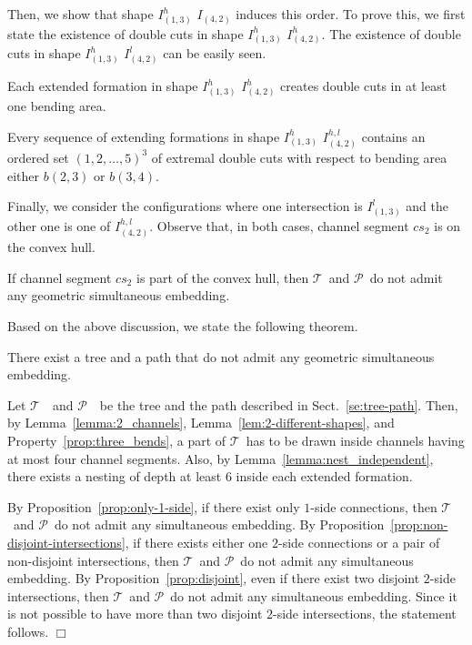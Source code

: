 \documentclass[a4paper,10pt]{llncs}
\newcounter{prop}
\renewenvironment{proof}
{{\bf Proof:}}{\hspace*{\fill}$\Box$\par\vspace{2mm}}
\newcommand{\T}{\mbox{$\mathcal T$ }}
\renewcommand{\P}{\mbox{$\mathcal P$ }}
\begin{document}
Then, we show that shape $I_{(1,3)}^h$ $I_{(4,2)}$ induces this order. To prove this, we first state the existence of double cuts in shape $I_{(1,3)}^h$ $I_{(4,2)}^h$. The existence of double cuts in shape $I_{(1,3)}^h$ $I_{(4,2)}^l$ can be easily seen.

\begin{lemma}\label{lem:double_cuts_13}
Each extended formation in shape $I_{(1,3)}^h$ $I_{(4,2)}^h$ creates double cuts in at least one bending area.
\end{lemma}

\begin{lemma}\label{lem:ordered-set-of-double-cuts-exists}
Every sequence of extending formations in shape $I_{(1,3)}^h$ $I_{(4,2)}^{h,l}$ contains an ordered set $(1,2,\ldots ,5)^3$ of extremal double cuts with respect to bending area either $b(2,3)$ or $b(3,4)$.
\end{lemma}

Finally, we consider the configurations where one intersection is $I_{(1,3)}^l$ and the other one is one of $I_{(4,2)}^{h,l}$. Observe that, in both cases, channel segment $cs_2$ is on the convex hull.

\begin{lemma}\label{lem:cs_two_convex_hull}
If channel segment $cs_2$ is part of the convex hull, then \T and \P do not admit any geometric simultaneous embedding.
\end{lemma}

Based on the above discussion, we state the following theorem.

\begin{theorem}
There exist a tree and a path that do not admit any geometric simultaneous embedding.
\end{theorem}
\begin{proof}
Let $\T$ and $\P$ be the tree and the path described in Sect.~\ref{se:tree-path}. Then, by Lemma~\ref{lemma:2_channels}, Lemma~\ref{lem:2-different-shapes}, and Property~\ref{prop:three_bends}, a part of \T has to be drawn inside channels having at most four channel segments. Also, by Lemma~\ref{lemma:nest_independent}, there exists a nesting of depth at least $6$ inside each extended formation.

By Proposition~\ref{prop:only-1-side}, if there exist only $1$-side connections, then \T and \P do not admit any simultaneous embedding. By Proposition~\ref{prop:non-disjoint-intersections}, if there exists either one $2$-side connections or a pair of non-disjoint intersections, then \T and \P do not admit any simultaneous embedding. By Proposition~\ref{prop:disjoint}, even if there exist two disjoint $2$-side intersections, then \T and \P do not admit any simultaneous embedding. Since it is not possible to have more than two disjoint $2$-side intersections, the statement follows.
\end{proof}
\end{document}
